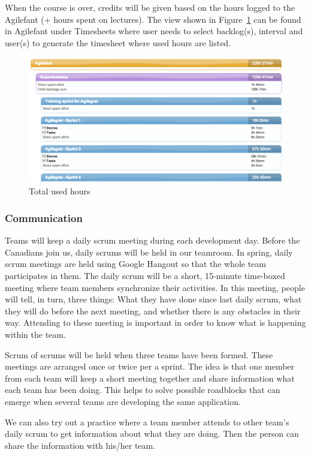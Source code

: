 When the course is over, credits will be given based on the hours logged to the 
Agilefant (+ hours spent on lectures). The view shown in 
Figure~\ref{fig:totalhours} can be found in Agilefant under Timesheets where
user needs to select backlog(s), interval and user(s) to generate the timesheet where used 
hours are listed.

\begin{figure}[H]
\centering
\includegraphics[width=1\textwidth]{imgs/totalhours.png}
\caption{Total used hours}
\label{fig:totalhours}
\end{figure}

\subsubsection{Communication}

Teams will keep a daily scrum meeting during each development day. Before the
Canadians join us, daily scrums will be held in our teamroom. In spring, daily
scrum meetings are held using Google Hangout so that the whole team participates
in them. The daily scrum will be a short, 15-minute time-boxed meeting where
team members synchronize their activities. In this meeting, people will tell, in
turn, three things: What they have done since last daily scrum, what they will
do before the next meeting, and whether there is any obstacles in their way.
Attending to these meeting is important in order to know what is happening
within the team.

Scrum of scrums will be held when three teams have been formed. These meetings
are arranged once or twice per a sprint. The idea is that one member from each team
will keep a short meeting together and share information what each team has been
doing. This helps to solve possible roadblocks that can emerge when several
teams are developing the same application.

We can also try out a practice where a team member attends to other team's daily
scrum to get information about what they are doing. Then the person can share
the information with his/her team.

